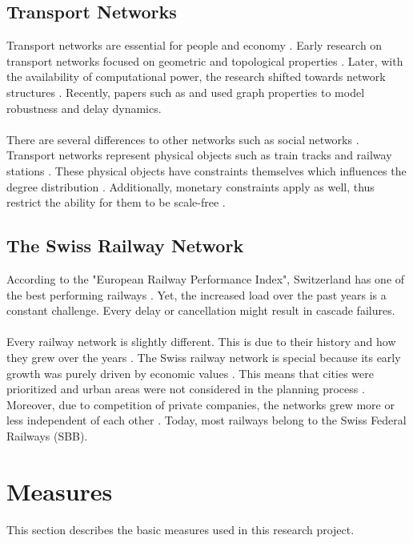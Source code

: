 \documentclass{Resources/netsci-project}
\begin{document}
\subsection{Transport Networks}
Transport networks are essential for people and economy \autocite{GraphSwiss} . Early research on transport networks focused on geometric and topological properties \autocite{GraphSwiss}. Later, with the availability of computational power, the research shifted towards network structures \autocite{GraphSwiss}. Recently, papers such as \textcite{Resilience} and \textcite{ComplexDelay} used graph properties to model robustness and delay dynamics.
\\~\\
There are several differences to other networks such as social networks \autocite{GraphSwiss}. Transport networks represent physical objects such as train tracks and railway stations \autocite{GraphSwiss}. These physical objects have constraints themselves which influences the degree distribution \autocite{GraphSwiss}. Additionally, monetary constraints apply as well, thus restrict the ability for them to be scale-free \autocite{GraphSwiss}.

\subsection{The Swiss Railway Network}
According to the "European Railway Performance Index", Switzerland has one of the best performing railways  \autocite{RailwayPerformanceIndex}. Yet, the increased load over the past years is a constant challenge. Every delay or cancellation might result in cascade failures.
\\~\\
Every railway network is slightly different. This is due to their history and how they grew over the years \autocite{GraphSwiss}. The Swiss railway network is special because its early growth was purely driven by economic values \autocite{GraphSwiss}. This means that cities were prioritized and urban areas were not considered in the planning process \autocite{GraphSwiss}. Moreover, due to competition of private companies, the networks grew more or less independent of each other \autocite{GraphSwiss}. Today, most railways belong to the Swiss Federal Railways (SBB).

\section{Measures}
This section describes the basic measures used in this research project.
\end{document}
